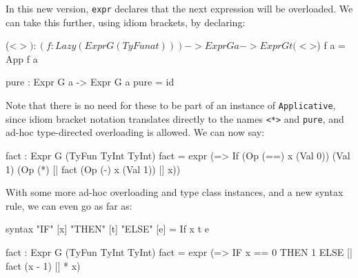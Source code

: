 \noindent
In this new version, \texttt{expr} declares that the next expression will be overloaded.
We can take this further, using idiom brackets, by declaring:

\begin{code}
(<$>) : (f : Lazy (Expr G (TyFun a t))) -> Expr G a -> Expr G t
(<$>) f a = App f a

pure : Expr G a -> Expr G a
pure = id
\end{code}

\noindent
Note that there is no need for these to be part of an instance of \texttt{Applicative}, since idiom bracket notation translates directly to the names \texttt{<*>} and \texttt{pure}, and ad-hoc type-directed overloading is allowed.
We can now say:

\begin{code}
fact : Expr G (TyFun TyInt TyInt)
fact = expr (\x => If (Op (==) x (Val 0))
                      (Val 1) (Op (*) [| fact (Op (-) x (Val 1)) |] x))
\end{code}

\noindent
With some more ad-hoc overloading and type class instances, and a new syntax rule, we can even go as far as:

\begin{code}
syntax "IF" [x] "THEN" [t] "ELSE" [e] = If x t e

fact : Expr G (TyFun TyInt TyInt)
fact = expr (\x => IF x == 0 THEN 1 ELSE [| fact (x - 1) |] * x)
\end{code}
